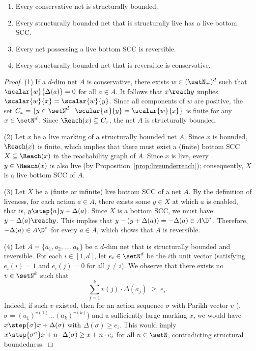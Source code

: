 \begin{lem}\label{lem:consstrbound}\hfill
	\begin{enumerate}
\item
Every conservative net is structurally bounded.
\item
Every structurally bounded net that is structurally live has a live
			bottom SCC.	
		\item
Every net possessing a live bottom SCC is reversible.			
		\item
Every structurally bounded net that is reversible is conservative.
\end{enumerate}
\end{lem}
\begin{proof}
	(1)
	If a $d$-dim net $A$ is conservative, there exists $w\in(\setN_+)^d$
	such that $\scalar{w}{\Delta(a)}=0$ for all $a\in A$. It
	follows that 
	$x\reach y$ implies $\scalar{w}{x}=\scalar{w}{y}$. Since  
 all components of $w$ are positive, the set $C_x=\{y\in\setN^d\mid
	\scalar{w}{y}=\scalar{w}{x}\}$ is finite for any $x\in\setN^d$. Since
	$\Reach(x)\subseteq C_x$, the net $A$ is structurally bounded.

(2)
Let $x$ be a live marking of a structurally bounded net $A$.
	Since $x$ is bounded, $\Reach(x)$ is finite, which implies
	that there must
	exist a (finite) bottom SCC $X\subseteq\Reach(x)$ in the
	reachability graph of $A$.
	Since $x$ is live, every $y\in\Reach(x)$ is also live (by
	Proposition~\ref{prop:liveunderreach});
	consequently, $X$ is a live bottom SCC of $A$.

	(3) Let $X$ be a (finite or infinite) live bottom SCC of a net
	$A$.  By the definition of 
liveness,
	for
 each action $a\in A$, there exists some $y\in X$ at which $a$ is enabled,
that is, 
 $y\step{a}y+\Delta(a)$. Since $X$ is a bottom SCC, we must have
	$y+\Delta(a)\reach y$.
	This implies that $y-(y+\Delta(a))=-\Delta(a)\in A\D^*$. 
	Therefore, $-\Delta(a)\in A\D^*$ for every $a\in A$, which
	shows that $A$ is
	reversible.

	(4)
	Let $A=\{a_1,a_2,\ldots,a_k\}$ be a $d$-dim net 
that is structurally bounded and reversible.
	For each $i\in[1,d]$, let $e_i\in\setN^d$
	be the $i$th unit vector (satisfying
	$e_i(i)=1$ and $e_i(j)=0$ for all $j\neq i$). We observe that
	there exists no
	$v\in \setN^k$ such that
	\begin{equation}\label{eq:biggerei}
		\sum_{j=1}^{k} v(j)\cdot\Delta(a_j) \;\geq\; e_i.
	\end{equation}
Indeed, if such $v$ existed, then for an action sequence 
$\sigma$ with Parikh vector $v$  
	(\eg, $\sigma=(a_1)^{v(1)}\ldots (a_k)^{v(k)}$)
	and a sufficiently large marking $x$, we would have
	 $x\step{\sigma}x+\Delta(\sigma)$ with $\Delta(\sigma)\geq
	 e_i$.
This would imply $x\step{\sigma^n}x+n\cdot\Delta(\sigma)\geq x+n\cdot
	e_i$ for all $n\in\setN$, contradicting structural
	boundedness.


\end{proof}
